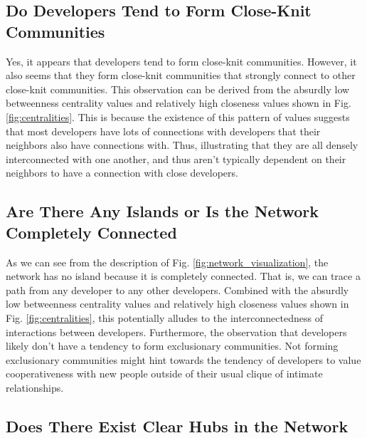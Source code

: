\documentclass[9pt,twocolumn,twoside]{pnas-new}
\begin{document}
\subsection{Do Developers Tend to Form Close-Knit Communities}

Yes, it appears that developers tend to form close-knit communities. However, it also seems that they form close-knit communities that strongly connect to other close-knit communities. This observation can be derived from the absurdly low betweenness centrality values and relatively high closeness values shown in Fig. \ref{fig:centralities}. This is because the existence of this pattern of values suggests that most developers have lots of connections with developers that their neighbors also have connections with. Thus, illustrating that they are all densely interconnected with one another, and thus aren't typically dependent on their neighbors to have a connection with close developers.

\subsection{Are There Any Islands or Is the Network Completely Connected}

As we can see from the description of Fig. \ref{fig:network_visualization}, the network has no island because it is completely connected. That is, we can trace a path from any developer to any other developers. Combined with the absurdly low betweenness centrality values and relatively high closeness values shown in Fig. \ref{fig:centralities}, this potentially alludes to the interconnectedness of interactions between developers. Furthermore, the observation that developers likely don't have a tendency to form exclusionary communities. Not forming exclusionary communities might hint towards the tendency of developers to value cooperativeness with new people outside of their usual clique of intimate relationships.

\subsection{Does There Exist Clear Hubs in the Network}
\end{document}
